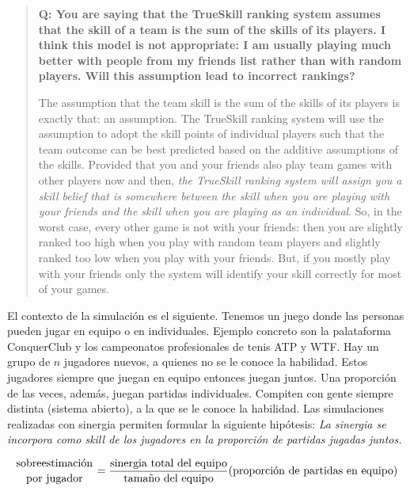 \documentclass[a4paper,11pt]{book}
\newcommand\hfrac[2]{\genfrac{}{}{0pt}{}{#1}{#2}} %
\theoremstyle{definition}
\begin{document}
\begin{quote}
 \footnotesize
 \textbf{Q: You are saying that the TrueSkill ranking system assumes that the skill of a team is the sum of the skills of its players. I think this model is not appropriate: I am usually playing much better with people from my friends list rather than with random players. Will this assumption lead to incorrect rankings?}

 \vspace{0.3cm}

 The assumption that the team skill is the sum of the skills of its players is exactly that: an assumption. The TrueSkill ranking system will use the assumption to adopt the skill points of individual players such that the team outcome can be best predicted based on the additive assumptions of the skills. Provided that you and your friends also play team games with other players now and then, \emph{the TrueSkill ranking system will assign you a skill belief that is somewhere between the skill when you are playing with your friends and the skill when you are playing as an individual}. So, in the worst case, every other game is not with your friends: then you are slightly ranked too high when you play with random team players and slightly ranked too low when you play with your friends. But, if you mostly play with your friends only the system will identify your skill correctly for most of your games.
\end{quote}

El contexto de la simulaci\'on es el siguiente.
Tenemos un juego donde las personas pueden jugar en equipo o en individuales.
Ejemplo concreto son la palataforma ConquerClub y los campeonatos profesionales de tenis ATP y WTF.
Hay un grupo de $n$ jugadores nuevos, a quienes no se le conoce la habilidad.
Estos jugadores siempre que juegan en equipo entonces juegan juntos.
Una proporci\'on de las veces, adem\'as, juegan partidas individuales.
Compiten con gente siempre distinta (sistema abierto), a la que se le conoce la habilidad.
Las simulaciones realizadas con sinergia permiten formular la siguiente hip\'otesis: \emph{La sinergia se incorpora como skill de los jugadores en la proporci\'on de partidas jugadas juntos.}

\begin{equation}\label{eq:sobreestimacion}
   \hfrac{\text{sobreestimaci\'on}}{\text{por jugador}} = \frac{\text{sinergia total del equipo}}{\text{tama\~no del equipo}}(\text{proporci\'on de partidas en equipo})
\end{equation}
\end{document}
